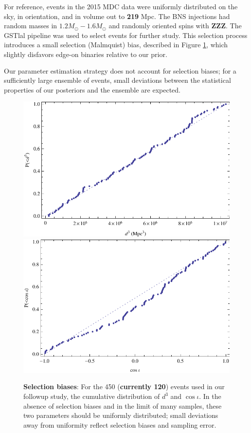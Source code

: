 \documentclass[twocolumn,prd,nofootinbib]{revtex4}
\newcommand\unit[1]{{\rm #1}}
\newcommand\gstlal{{\sc GSTlal}}
\begin{document}
For reference, events in the 2015 MDC data were uniformly distributed on the sky, in orientation, and in volume out to
\textbf{219} \unit{Mpc}.  The BNS injections had random masses in $1.2 M_\odot-1.6 M_\odot$ and randomly oriented spins with
\textbf{ZZZ}.   The \gstlal{} pipeline was used to select events for further study.  This selection process introduces a
small selection (Malmquist) bias, described in Figure \ref{fig:SearchSelection}, 
which slightly disfavors edge-on binaries relative to our prior.    
%

Our parameter estimation strategy does not account for selection biases; for a sufficiently large ensemble of events,
small deviations between the statistical properties of our posteriors and the ensemble are expected. 


\begin{figure}
\includegraphics[width=\columnwidth]{../Figures/fig-mma-manual-2015MDC-SelectedEvents-DistanceCumulative}
\includegraphics[width=\columnwidth]{../Figures/fig-mma-manual-2015MDC-SelectedEvents-CosIotaCumulative}
\caption{\label{fig:SearchSelection}\textbf{Selection biases}: For the 450 (\textbf{currently 120}) events used in our followup study, the cumulative distribution of $d^3$
  and $\cos \iota$.  In the absence of selection biases and in the limit of many samples, these two parameters should be
  uniformly distributed; small deviations away from uniformity reflect selection biases and sampling error.
}
\end{figure}
\end{document}
